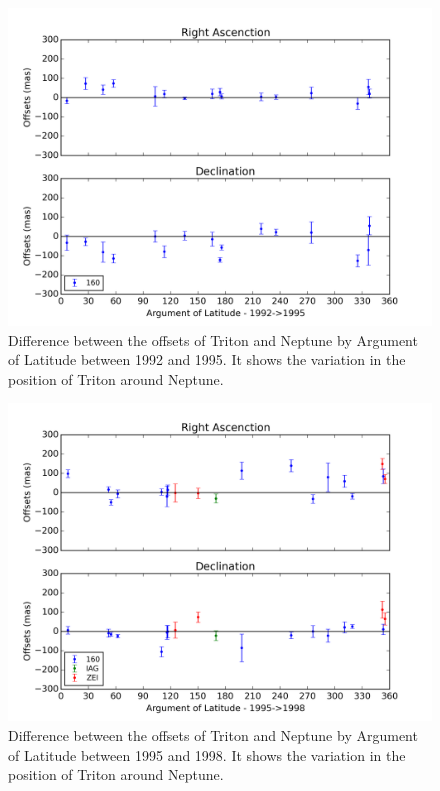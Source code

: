 \documentclass[12pt,a4paper]{report}
\begin{document}
\begin{figure}[H]
\includegraphics[width=16.0cm]{Anom_TN_1992-1995.png} 
\caption{Difference between the offsets of Triton and Neptune by Argument of Latitude between 1992 and 1995. It shows the variation in the position of Triton around Neptune.}
\label{Fig:triton-netuno-anom}
\end{figure}

\begin{figure}[H]
\includegraphics[width=16.0cm]{Anom_TN_1995-1998.png} 
\caption{Difference between the offsets of Triton and Neptune by Argument of Latitude between 1995 and 1998. It shows the variation in the position of Triton around Neptune.}
\label{Fig:triton-netuno-anom}
\end{figure}
\end{document}
